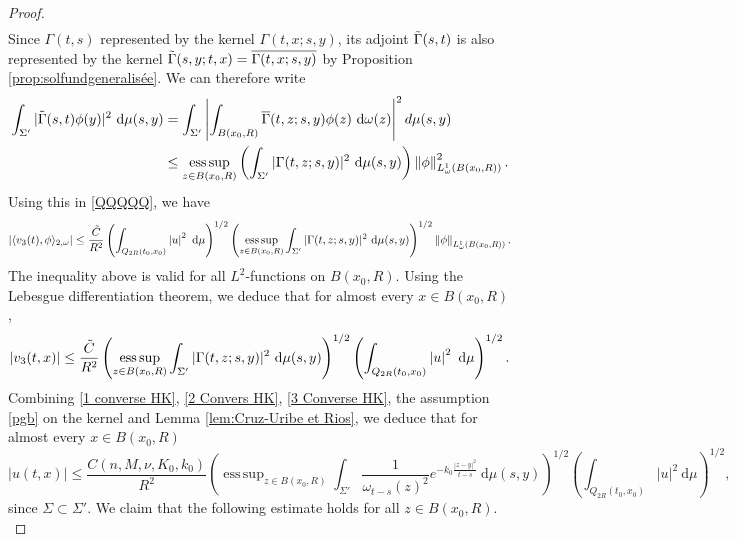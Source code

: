 \documentclass[10pt,a4paper]{amsart}
\DeclareMathOperator*{\supess}{ess\,sup}
\begin{document}
\begin{proof}
\begin{align}
\end{align}
Since $\Gamma(t,s)$ represented by the kernel $\Gamma(t,x;s,y)$, its adjoint $\Tilde{\Gamma}(s,t)$ is also represented by the kernel $\Tilde{\Gamma}(s,y;t,x)= \overline{\Gamma(t,x;s,y)}$ by Proposition \ref{prop:solfundgeneralisée}. We can therefore write 
\begin{align*}
    \int_{\Sigma'} |  \Tilde{\Gamma}(s,t)\phi (y)    |^2 \ \mathrm d\mu(s,y) &= \int_{\Sigma'} \left | \int_{B(x_0,R)}  \overline{\Gamma}(t,z;s,y) \phi(z)\ \mathrm d\omega(z) \right |^2 d \mu(s,y)
    \\ & \leq \supess_{z \in B(x_0,R)} \left ( \int_{\Sigma'}  | \Gamma(t,z;s,y)  |^2 \ \mathrm d\mu(s,y)  \right ) \left \| \phi \right \|^2_{L^1_\omega(B(x_0,R))}.
\end{align*}
Using this in \eqref{QQQQQ}, we have 
\begin{equation*}
    \left |  \langle v_3(t), \phi \rangle_{2,\omega} \right |\leq \frac{\Tilde{C}}{R^2}  \left ( \int_{Q_{2R}(t_0,x_0) } \left |  u  \right |^2 \ \mathrm d\mu \right )^{1/2} \left (\supess_{z \in B(x_0,R)} \int_{\Sigma'}  | \Gamma(t,z;s,y)     |^2 \ \mathrm d\mu(s,y)  \right )^{1/2} \left \| \phi \right \|_{L^1_\omega(B(x_0,R))}.
\end{equation*}
The inequality above is valid for all $L^2$-functions on $B(x_0,R)$. Using the Lebesgue differentiation theorem, we deduce that for almost every $x \in B(x_0,R)$,
\begin{equation}\label{3 Converse HK}
    \left |  v_3(t,x) \right | \leq  \frac{\Tilde{C}}{R^2} \left (\supess_{z \in B(x_0,R)} \int_{\Sigma'} | \Gamma(t,z;s,y)     |^2 \ \mathrm d\mu(s,y)  \right )^{1/2} \left ( \int_{Q_{2R}(t_0,x_0) } \left |  u  \right |^2 \ \mathrm d\mu \right )^{1/2}  .
\end{equation}
Combining \eqref{1 converse HK}, \eqref{2 Convers HK}, \eqref{3 Converse HK}, the assumption \eqref{pgb} on the kernel and Lemma \ref{lem:Cruz-Uribe et Rios}, we deduce that for almost every $x \in B(x_0,R)$
\begin{equation}\label{LL}
    \left |  u(t,x) \right | \leq  \frac{C(n,M,\nu,K_0,k_0)}{R^2} \left (\supess_{z \in B(x_0,R)} \int_{\Sigma'} \frac{1}{\omega_{t-s}(z)^2} e ^{-k_0 \frac{\left | z-y \right |^2}{t-s}} \ \mathrm d\mu(s,y)  \right )^{1/2} \left ( \int_{Q_{2R}(t_0,x_0) } \left |  u  \right |^2 \ \mathrm d\mu \right )^{1/2},
\end{equation}
since $\Sigma \subset \Sigma'$. We claim that the following estimate holds for all $z \in B(x_0,R)$.
\begin{equation}\label{Poids}

\end{equation}
\end{proof}
\end{document}
